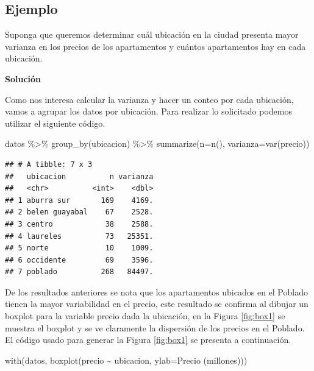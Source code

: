 \documentclass[
]{book}
\makeatletter
\newenvironment{Shaded}{\begin{snugshade}}{\end{snugshade}}
\newcommand{\AttributeTok}[1]{\textcolor[rgb]{0.77,0.63,0.00}{#1}}
\newcommand{\FunctionTok}[1]{\textcolor[rgb]{0.00,0.00,0.00}{#1}}
\newcommand{\NormalTok}[1]{#1}
\newcommand{\SpecialCharTok}[1]{\textcolor[rgb]{0.00,0.00,0.00}{#1}}
\newcommand{\StringTok}[1]{\textcolor[rgb]{0.31,0.60,0.02}{#1}}
\newenvironment{kframe}{%
\medskip{}
\setlength{\fboxsep}{.8em}
 \def\at@end@of@kframe{}%
 \ifinner\ifhmode%
  \def\at@end@of@kframe{\end{minipage}}%
  \begin{minipage}{\columnwidth}%
 \fi\fi%
 \def\FrameCommand##1{\hskip\@totalleftmargin \hskip-\fboxsep
 \colorbox{shadecolor}{##1}\hskip-\fboxsep
     \hskip-\linewidth \hskip-\@totalleftmargin \hskip\columnwidth}%
 \MakeFramed {\advance\hsize-\width
   \@totalleftmargin\z@ \linewidth\hsize
   \@setminipage}}%
 {\par\unskip\endMakeFramed%
 \at@end@of@kframe}
\renewenvironment{Shaded}{\begin{kframe}}{\end{kframe}}
\makeatother
\begin{document}
\hypertarget{ejemplo-37}{%
\subsection*{Ejemplo}\label{ejemplo-37}}

Suponga que queremos determinar cuál ubicación en la ciudad presenta mayor varianza en los precios de los apartamentos y cuántos apartamentos hay en cada ubicación.

\textbf{Solución}

Como nos interesa calcular la varianza y hacer un conteo por cada ubicación, vamos a agrupar los datos por ubicación. Para realizar lo solicitado podemos utilizar el siguiente código.

\begin{Shaded}
\begin{Highlighting}[]
\NormalTok{datos }\SpecialCharTok{\%\textgreater{}\%} 
  \FunctionTok{group\_by}\NormalTok{(ubicacion) }\SpecialCharTok{\%\textgreater{}\%} 
  \FunctionTok{summarize}\NormalTok{(}\AttributeTok{n=}\FunctionTok{n}\NormalTok{(),}
            \AttributeTok{varianza=}\FunctionTok{var}\NormalTok{(precio))}
\end{Highlighting}
\end{Shaded}

\begin{verbatim}
## # A tibble: 7 x 3
##   ubicacion          n varianza
##   <chr>          <int>    <dbl>
## 1 aburra sur       169    4169.
## 2 belen guayabal    67    2528.
## 3 centro            38    2588.
## 4 laureles          73   25351.
## 5 norte             10    1009.
## 6 occidente         69    3596.
## 7 poblado          268   84497.
\end{verbatim}

De los resultados anteriores se nota que los apartamentos ubicados en el Poblado tienen la mayor variabilidad en el precio, este resultado se confirma al dibujar un boxplot para la variable precio dada la ubicación, en la Figura \ref{fig:box1} se muestra el boxplot y se ve claramente la dispersión de los precios en el Poblado. El código usado para generar la Figura \ref{fig:box1} se presenta a continuación.

\begin{Shaded}
\begin{Highlighting}[]
\FunctionTok{with}\NormalTok{(datos, }\FunctionTok{boxplot}\NormalTok{(precio }\SpecialCharTok{\textasciitilde{}}\NormalTok{ ubicacion, }\AttributeTok{ylab=}\StringTok{\textquotesingle{}Precio (millones)\textquotesingle{}}\NormalTok{))}
\end{Highlighting}
\end{Shaded}
\end{document}
